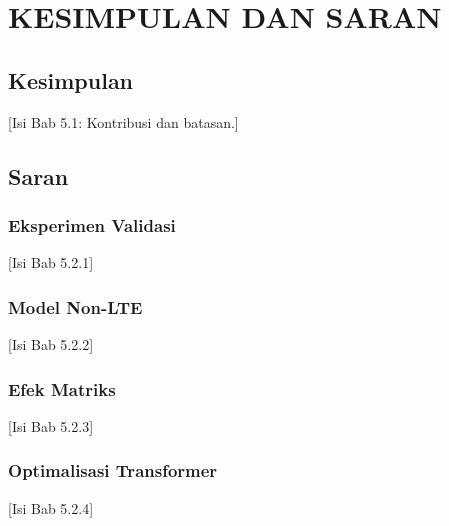 \chapter{KESIMPULAN DAN SARAN}

\section{Kesimpulan}
[Isi Bab 5.1: Kontribusi dan batasan.]

\section{Saran}
\subsection{Eksperimen Validasi}
[Isi Bab 5.2.1]

\subsection{Model Non-LTE}
[Isi Bab 5.2.2]

\subsection{Efek Matriks}
[Isi Bab 5.2.3]

\subsection{Optimalisasi Transformer}
[Isi Bab 5.2.4]

